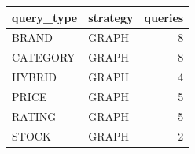 \begin{tabular}{llr}
\toprule
query_type & strategy & queries \\
\midrule
BRAND & GRAPH & 8 \\
CATEGORY & GRAPH & 8 \\
HYBRID & GRAPH & 4 \\
PRICE & GRAPH & 5 \\
RATING & GRAPH & 5 \\
STOCK & GRAPH & 2 \\
\bottomrule
\end{tabular}
